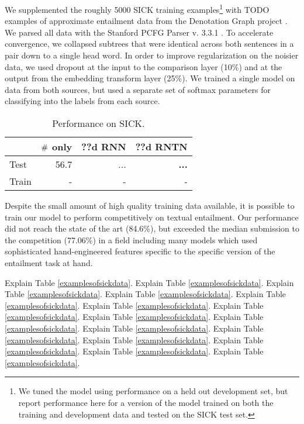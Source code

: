 We supplemented the roughly 5000 SICK training examples\footnote{We tuned the model using performance on a held out development set, but report performance here for a version of the model trained on both the training and development data and tested on the SICK test set.} with TODO examples of approximate entailment data from the Denotation Graph project \cite{hodoshimage}. We parsed all data with the Stanford PCFG Parser v. 3.3.1 \cite{klein2003accurate}. To accelerate convergence, we collapsed subtrees that were identical across both sentences in a pair down to a single head word. In order to improve regularization on the noisier data, we used dropout \cite{hinton2012improving} at the input to the comparison layer (10\%) and at the output from the embedding transform layer (25\%). We trained a single model on data from both sources, but used a separate set of softmax parameters for classifying into the labels from each source.

\begin{table}[tp]
  \centering \small
  \begin{tabular}{ l r@{ \ } r@{ \ } r@{ \ } }
    \toprule
    ~&\multicolumn{1}{c}{$\mathbin{\#}$ only} & \multicolumn{1}{c}{??d RNN}  & \multicolumn{1}{c}{??d RNTN}\\
    \midrule
    Test & 56.7 &	...& \textbf{...} \\
    Train &- &- &-  \\
    \bottomrule
  \end{tabular}
  \caption{Performance on SICK.}
  \label{sresultstable}
\end{table} 

Despite the small amount of high quality training data available, it is possible to train our model to perform competitively on textual entailment. Our performance did not reach the state of the art (84.6\%), but exceeded the median submission to the competition (77.06\%) in a field including many models which used sophisticated hand-engineered features specific to the specific version of the entailment task at hand.

Explain Table \ref{examplesofsickdata}. 
Explain Table \ref{examplesofsickdata}. 
Explain Table \ref{examplesofsickdata}. 
Explain Table \ref{examplesofsickdata}. 
Explain Table \ref{examplesofsickdata}. 
Explain Table \ref{examplesofsickdata}. 
Explain Table \ref{examplesofsickdata}. 
Explain Table \ref{examplesofsickdata}. 
Explain Table \ref{examplesofsickdata}. 
Explain Table \ref{examplesofsickdata}. 
Explain Table \ref{examplesofsickdata}. 
Explain Table \ref{examplesofsickdata}. 
Explain Table \ref{examplesofsickdata}. 
Explain Table \ref{examplesofsickdata}. 
Explain Table \ref{examplesofsickdata}. 
